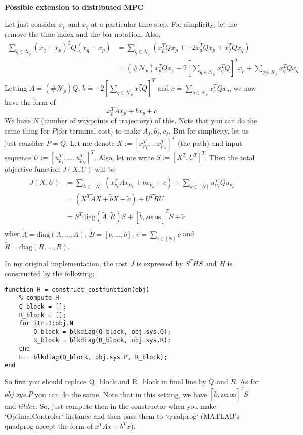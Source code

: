 \documentclass[11pt]{article}
\newcommand{\np}{\mathcal{N}_p}
\begin{document}
\begin{center}
  \textbf{Possible extension to distributed MPC} 
\end{center}

Let just consider $x_p$ and $x_q$ at a particular time step. For simplicity, let me remove the time index and the bar notation. Also, 
\begin{align}
  \sum_{q\in \np}(x_q -x_p)^T Q (x_q - x_p) &= \sum_{q \in \np} \left( x_p^T Q x_p + - 2 x_q^T Q x_p + x_q^T Q x_q  \right) \\
   & = (\#\np) x_p^T Q x_p - 2 \left[ \sum_{q\in \np} x_q^T Q \right] ^T x_p + \sum_{q\in \np} x_q^T Q x_q
\end{align}
Letting $A = (\#\np) Q$, $b = -2\left[ \sum_{q\in \np} x_q^T Q \right] ^T$ and $c = \sum_{q\in \np} x_q^T Q x_q$, we now have the form of 
\[
  x_p^TAx_p + b x_p + c
\]
We have $N$ (number of waypoints of trajectory) of this. Note that you can do the same thing for $P$(for terminal cost) to make $A_f, b_f, c_f$. But for simplicity, let us just consider $P=Q$. Let me denote $X:=[x_{p_1}^T, \ldots x_{p_N}^T]^T$ (the path) and input sequence $U:=[u_{p_1}^T, \ldots, u_{p_N}^T]^T$. Also, let me write $S:=[X^T, U^T]^T$. Then the total objective function $J(X, U)$ will be 
\begin{align}
  J(X, U) &= \sum_{k\in [N]} \left( x_{p_k}^T A x_{p_k} + b x_{p_k} + c \right) + \sum_{k\in[N]} u_{p_k}^TQu_{p_{k}} \\
  &= \left( X^T \tilde{A} X + \tilde{b} X + \tilde{c} \right)  + U^T \tilde{R} U \\
  &= S^T \mathrm{diag}(\tilde{A}, \tilde{R}) S + [\tilde{b}, \mathrm{zeros}]^T S + \tilde{c}\\
\end{align} 
wher $\tilde{A} = \mathrm{diag}(A, \ldots, A)$, $\tilde{B} = [b, \ldots, b]$, $\tilde{c}=\sum_{i\in [N]}^{} c$ and $\tilde{R} = \mathrm{diag}(R, \ldots, R)$. 

In my original implementation, the cost $J$ is expressed by $S^T H S$ and $H$ is constructed by the following:
\begin{lstlisting}
function H = construct_costfunction(obj)
    % compute H
    Q_block = [];
    R_block = [];
    for itr=1:obj.N
        Q_block = blkdiag(Q_block, obj.sys.Q);
        R_block = blkdiag(R_block, obj.sys.R);
    end
    H = blkdiag(Q_block, obj.sys.P, R_block);
end
\end{lstlisting}
So first you should replace Q\_block and R\_block in final line by $\tilde{Q}$ and $\tilde{R}$. As for $obj.sys.P$ you can do the same. Note that in this setting, we have $[\tilde{b}, \mathrm{zeros}]^TS$ and $tilde{c}$. So, just compute then in the constructor when you make `OptimalControler` instance and then pass them to `quadprog` (MATLAB's quadprog accept the form of $x^T A x + b^Tx$).
\end{document}
